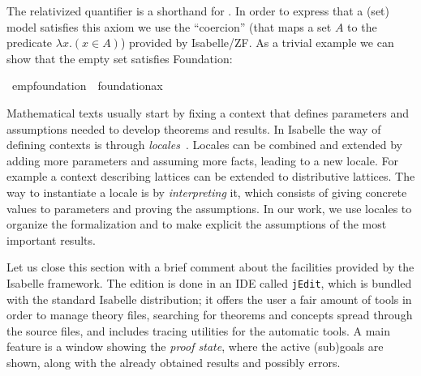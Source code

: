 \noindent The relativized quantifier
 is a shorthand for \isa{{\isasymforall}x{\isachardot}\ M(x)
  {\isasymlongrightarrow} P(x)}. In order to express that a (set) model
satisfies this axiom we use  the ``coercion''
 (that maps a set $A$ to the predicate
$\lambda x . (x\in A)$) provided by Isabelle/ZF. As a trivial example we
can show that the empty set satisfies Foundation:
\begin{isabelle}
\isamarkupfalse%
\ emp{\isacharunderscore}foundation\ {\isacharcolon}\ {\isachardoublequoteopen}foundation{\isacharunderscore}ax{\isacharparenleft}{\isacharhash}{\isacharhash}{}{\isacharparenright}{\isachardoublequoteclose}
\end{isabelle}




Mathematical texts usually start by fixing a context that defines
parameters and assumptions needed to develop theorems
and results. In Isabelle the way of defining contexts is through
\emph{locales}~\cite{ballarin2010tutorial}.
Locales can be combined and extended by adding more parameters and assuming
more facts, leading to a new locale. For example a context describing
lattices can be extended to distributive lattices.
The way to instantiate a locale is by \emph{interpreting} it, which consists
of giving concrete values to parameters and proving the assumptions.
In our work, we use locales to organize the formalization and to make
explicit the assumptions of the most important results.

Let us close this section with a brief comment about the facilities
provided by the Isabelle framework. The edition is done in an IDE
called \texttt{jEdit}, which is bundled with the standard Isabelle
distribution; it offers the user a fair amount of tools in order to
manage theory files, searching for theorems and concepts spread
through the source files, and includes tracing utilities for the
automatic tools. A main feature is a window showing the \emph{proof
  state}, where the active (sub)goals are shown, along with the
already obtained results and possibly errors.

